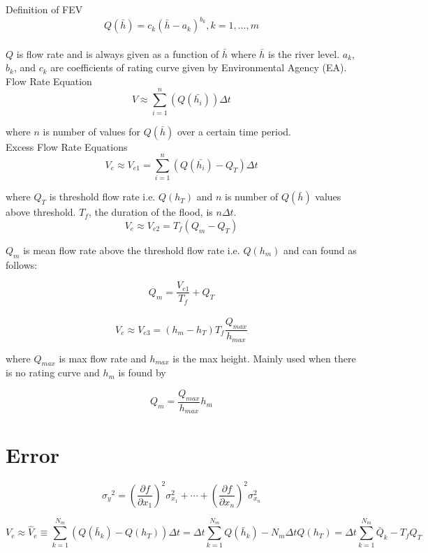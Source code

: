 Definition of FEV \\

$$Q(\bar{h})=c_k(\bar{h}-a_k)^{b_k}, k = 1,...,m$$ \\

$Q$ is flow rate and is always given as a function of $\bar{h}$ where $\bar{h}$ is the river level. $a_k$, $b_k$, and $c_k$ are coefficients of rating curve given by Environmental Agency (EA). \\

Flow Rate Equation\\

$$V \approx \sum_{i=1}^{n}(Q(\bar{h_i}))\Delta t$$

where $n$ is number of values for $Q(\bar{h})$ over a certain time period. \\

Excess Flow Rate Equations \\

$$V_e \approx V_{e1} = \sum_{i=1}^{n}(Q(\bar{h_i})-Q_T)\Delta t$$

where $Q_T$ is threshold flow rate i.e. $Q(h_T)$ and $n$ is number of $Q(\bar{h})$ values above threshold. $T_f$, the duration of the flood, is $n \Delta t$.\\

$$V_e \approx V_{e2} = T_f(Q_m-Q_T)$$

$Q_m$ is mean flow rate above the threshold flow rate i.e. $Q(h_m)$ and can found as follows:

$$Q_m = \frac{V_{e1}}{T_f}+Q_T$$ \\

$$V_e \approx V_{e3} = (h_m - h_T)T_f\frac{Q_{max}}{h_{max}}$$

where $Q_{max}$ is max flow rate and $h_{max}$ is the max height. Mainly used when there is no rating curve and $h_m$ is found by

$$Q_m = \frac{Q_{max}}{h_{max}}h_m$$

\section*{Error}

\[{\sigma _{y}}^2=\left ( {\frac{\partial f}{\partial x_{1}}} \right )^2\sigma _{x_{1}}^2+\cdots+\left ( {\frac{\partial f}{\partial x_{n}}} \right )^2\sigma _{x_{n}}^2\]


\[V_{e}\approx \widehat{V}_{e}\equiv \sum_{k=1}^{N_{m}}\left(Q\left (\bar{h}_{k} \right )-Q\left (h_{T} \right ) \right )\Delta t=\Delta t\sum_{k=1}^{N_{m}} Q\left (\bar{h}_{k} \right )-N_{m}\Delta tQ\left ( h_{T} \right )= \Delta t\sum_{k=1}^{N_{m}}\bar{Q}_{k}-T_{f}Q_{T}\]


